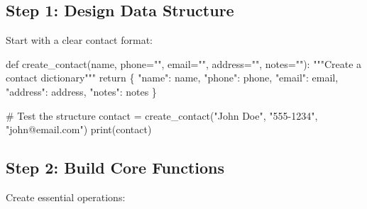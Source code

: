 \documentclass[
  letterpaper,
  DIV=11,
  numbers=noendperiod,
  oneside]{scrreprt}
\newenvironment{Shaded}{}{}
\newcommand{\BuiltInTok}[1]{\textcolor[rgb]{0.84,0.23,0.29}{#1}}
\newcommand{\CommentTok}[1]{\textcolor[rgb]{0.42,0.45,0.49}{#1}}
\newcommand{\ControlFlowTok}[1]{\textcolor[rgb]{0.84,0.23,0.29}{#1}}
\newcommand{\KeywordTok}[1]{\textcolor[rgb]{0.84,0.23,0.29}{#1}}
\newcommand{\NormalTok}[1]{\textcolor[rgb]{0.14,0.16,0.18}{#1}}
\newcommand{\OperatorTok}[1]{\textcolor[rgb]{0.14,0.16,0.18}{#1}}
\newcommand{\StringTok}[1]{\textcolor[rgb]{0.01,0.18,0.38}{#1}}
\begin{document}
\subsection{Step 1: Design Data
Structure}\label{step-1-design-data-structure}

Start with a clear contact format:

\begin{Shaded}
\begin{Highlighting}[]
\KeywordTok{def}\NormalTok{ create\_contact(name, phone}\OperatorTok{=}\StringTok{""}\NormalTok{, email}\OperatorTok{=}\StringTok{""}\NormalTok{, address}\OperatorTok{=}\StringTok{""}\NormalTok{, notes}\OperatorTok{=}\StringTok{""}\NormalTok{):}
    \CommentTok{"""Create a contact dictionary"""}
    \ControlFlowTok{return}\NormalTok{ \{}
        \StringTok{"name"}\NormalTok{: name,}
        \StringTok{"phone"}\NormalTok{: phone,}
        \StringTok{"email"}\NormalTok{: email,}
        \StringTok{"address"}\NormalTok{: address,}
        \StringTok{"notes"}\NormalTok{: notes}
\NormalTok{    \}}

\CommentTok{\# Test the structure}
\NormalTok{contact }\OperatorTok{=}\NormalTok{ create\_contact(}\StringTok{"John Doe"}\NormalTok{, }\StringTok{"555{-}1234"}\NormalTok{, }\StringTok{"john@email.com"}\NormalTok{)}
\BuiltInTok{print}\NormalTok{(contact)}
\end{Highlighting}
\end{Shaded}

\subsection{Step 2: Build Core
Functions}\label{step-2-build-core-functions}

Create essential operations:
\end{document}
